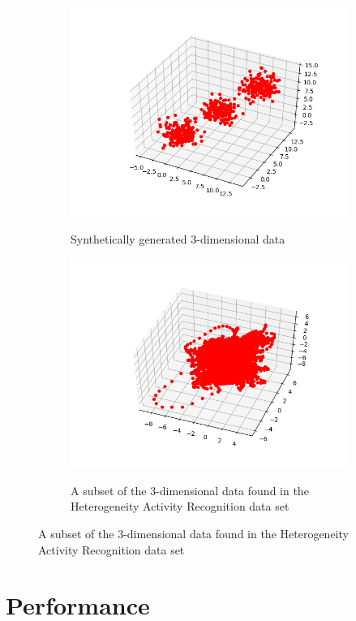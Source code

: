 \documentclass{l4proj}
\begin{document}
\begin{figure}[H]
\label{used data}
\begin{subfigure}{.5\textwidth}
  \includegraphics[width=1\linewidth]{images/figure_3}
  \label{fig:sub1}
  \caption{Synthetically generated 3-dimensional data}
\end{subfigure}%
\begin{subfigure}{.5\textwidth}
  \includegraphics[width=1\linewidth]{images/figure_4}
  \label{fig:sub2}
  \caption{A subset of the 3-dimensional data found in the Heterogeneity Activity Recognition data set}
\end{subfigure}
\end{figure}

\section{Performance}
\end{document}
